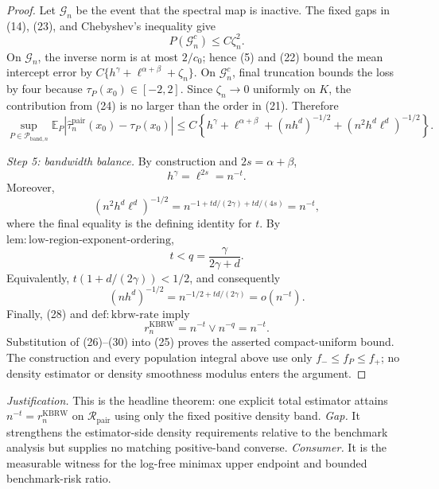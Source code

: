 \documentclass{article}
\begin{document}
\begin{proof}
Let \(\mathcal G_n\) be the event that the spectral map is inactive.  The fixed gaps in (14), (23), and Chebyshev's inequality give
\[
P(\mathcal G_n^c)\leq C\zeta_n^2.
\tag{24}
\]
On \(\mathcal G_n\), the inverse norm is at most \(2/c_0\); hence (5) and (22) bound the mean intercept error by \(C\{h^\gamma+\ell^{\alpha+\beta}+\zeta_n\}\).  On \(\mathcal G_n^c\), final truncation bounds the loss by four because \(\tau_P(x_0)\in[-2,2]\).  Since \(\zeta_n\to0\) uniformly on \(K\), the contribution from (24) is no larger than the order in (21).  Therefore
\[
\sup_{P\in\mathcal P_{\mathrm{band},n}}
\mathbb E_P\left|
\widehat\tau_n^{\mathrm{pair}}(x_0)-\tau_P(x_0)
\right|
\leq C\left\{
h^\gamma+\ell^{\alpha+\beta}
+(nh^d)^{-1/2}+(n^2h^d\ell^d)^{-1/2}
\right\}.
\tag{25}
\]

\emph{Step 5: bandwidth balance.}
By construction and \(2s=\alpha+\beta\),
\[
h^\gamma=\ell^{2s}=n^{-t}.
\tag{26}
\]
Moreover,
\[
(n^2h^d\ell^d)^{-1/2}
=n^{-1+td/(2\gamma)+td/(4s)}=n^{-t},
\tag{27}
\]
where the final equality is the defining identity for \(t\).  By \(\mathrm{lem:low\mbox{-}region\mbox{-}exponent\mbox{-}ordering}\),
\[
t<q=\frac\gamma{2\gamma+d}.
\tag{28}
\]
Equivalently, \(t(1+d/(2\gamma))<1/2\), and consequently
\[
(nh^d)^{-1/2}
=n^{-1/2+td/(2\gamma)}=o(n^{-t}).
\tag{29}
\]
Finally, (28) and \(\mathrm{def:kbrw\mbox{-}rate}\) imply
\[
r_n^{\mathrm{KBRW}}=n^{-t}\vee n^{-q}=n^{-t}.
\tag{30}
\]
Substitution of (26)--(30) into (25) proves the asserted compact-uniform bound.  The construction and every population integral above use only \(f_-\leq f_P\leq f_+\); no density estimator or density smoothness modulus enters the argument.
\end{proof}
\par\smallskip\noindent \textit{Justification.} This is the headline theorem: one explicit total estimator attains \(n^{-t}=r_n^{\mathrm{KBRW}}\) on \(\mathcal R_{\mathrm{pair}}\) using only the fixed positive density band. \textit{Gap.} It strengthens the estimator-side density requirements relative to the benchmark analysis but supplies no matching positive-band converse. \textit{Consumer.} It is the measurable witness for the log-free minimax upper endpoint and bounded benchmark-risk ratio.
\end{document}
